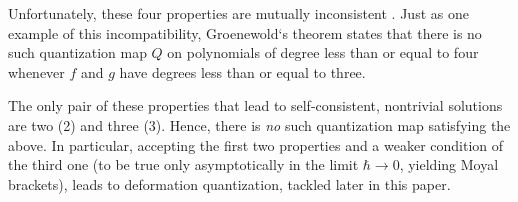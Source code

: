 \documentclass[a4paper,10pt]{article}
\numberwithin{equation}{section}
\begin{document}
Unfortunately, these four properties are mutually inconsistent \cite{incompatibility}. Just as one example of this incompatibility, Groenewold`s theorem states that there is no such quantization map $Q$ on polynomials of degree less than or equal to four whenever $f$ and $g$ have degrees less than or equal to three.

The only pair of these properties that lead to self-consistent, nontrivial solutions are two (2) and three (3). Hence, there is \textit{no} such quantization map satisfying the above.  In particular, accepting the first two properties and a weaker condition of the third one (to be true only asymptotically in the limit $\hbar \to 0$, yielding Moyal brackets), leads to deformation quantization, tackled later in this paper.
\end{document}
